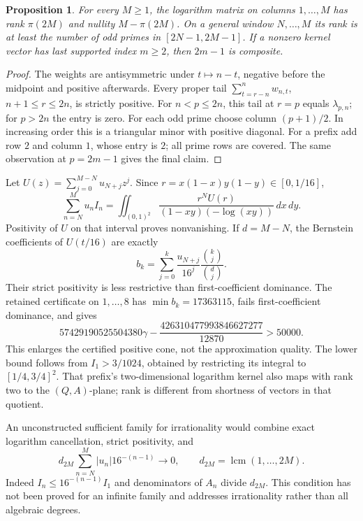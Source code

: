 \documentclass[11pt,a4paper]{article}
\newtheorem{proposition}[theorem]{Proposition}
\theoremstyle{definition}
\theoremstyle{remark}
\numberwithin{equation}{section}
\begin{document}
\begin{proposition}\label{ar:sondowrank}
For every $M\ge1$, the logarithm matrix on columns $1,\ldots,M$ has
rank $\pi(2M)$ and nullity $M-\pi(2M)$.  On a general window $N,\ldots,M$
its rank is at least the number of odd primes in $[2N-1,2M-1]$.
If a nonzero kernel vector has last supported index $m\ge2$, then
$2m-1$ is composite.
\end{proposition}
\begin{proof}
The weights are antisymmetric under $t\mapsto n-t$, negative before the
midpoint and positive afterwards.  Every proper tail
$\sum_{t=r-n}^nw_{n,t}$, $n+1\le r\le2n$, is strictly positive.
For $n<p\le2n$, this tail at $r=p$ equals $\lambda_{p,n}$; for $p>2n$
the entry is zero.  For each odd prime choose column $(p+1)/2$.  In
increasing order this is a triangular minor with positive diagonal.
For a prefix add row $2$ and column $1$, whose entry is $2$; all prime
rows are covered.  The same observation at $p=2m-1$ gives the final claim.
\end{proof}
Let $U(z)=\sum_{j=0}^{M-N}u_{N+j}z^j$.  Since
$r=x(1-x)y(1-y)\in[0,1/16]$,
\[
 \sum_{n=N}^Mu_nI_n=
 \iint_{(0,1)^2}\frac{r^NU(r)}{(1-xy)(-\log(xy))}\,dx\,dy.
\]
Positivity of $U$ on that interval proves nonvanishing.  If $d=M-N$,
the Bernstein coefficients of $U(t/16)$ are exactly
\[
 b_k=\sum_{j=0}^k\frac{u_{N+j}}{16^j}\frac{\binom kj}{\binom dj}.
\]
Their strict positivity is less restrictive than first-coefficient
dominance.  The retained certificate on $1,\ldots,8$ has
$\min b_k=17363115$, fails first-coefficient dominance, and gives
\[
 57429190525504380\gamma-
 \frac{426310477993846627277}{12870}>50000.
\]
This enlarges the certified positive cone, not the approximation quality.
The lower bound follows from $I_1>3/1024$, obtained by restricting its
integral to $[1/4,3/4]^2$.  That prefix's two-dimensional logarithm kernel
also maps with rank two to the $(Q,A)$-plane; rank is different from
shortness of vectors in that quotient.

An unconstructed sufficient family for irrationality would combine exact
logarithm cancellation, strict positivity, and
\[
 d_{2M}\sum_{n=N}^M|u_n|16^{-(n-1)}\longrightarrow0,
 \qquad d_{2M}=\operatorname{lcm}(1,\ldots,2M).
\]
Indeed $I_n\le16^{-(n-1)}I_1$ and denominators of $A_n$ divide $d_{2M}$.
This condition has not been proved for an infinite family and addresses
irrationality rather than all algebraic degrees.
\end{document}
